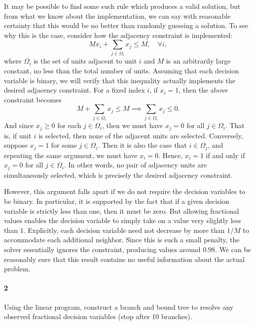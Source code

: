 \documentclass[12pt]{article}
\newenvironment{fullbox}{\begin{lrbox}{\savefullbox}\begin{minipage}{\dimexpr\textwidth-2\fboxsep\relax}}{\end{minipage}\end{lrbox}\begin{center}\framebox[\textwidth]{\usebox{\savefullbox}}\end{center}}
\newenvironment{pbox}[1][]{\begin{fullbox}\ifx#1\empty\else\paragraph{#1}\fi}{\end{fullbox}}
\theoremstyle{definition}
\newcommand{\tsum}{\textstyle\sum\limits}
\begin{document}
It may be possible to find some such rule which produces a valid solution, but from what we know about the implementation, we can say with reasonable certainty that this would be no better than randomly guessing a solution. To see why this is the case, consider how the adjacency constraint is implemented:
\[
    Mx_i + \tsum_{j \in \Omega_i} x_j \leq M, \quad \forall i,
\]
where $\Omega_i$ is the set of units adjacent to unit $i$ and $M$ is an arbitrarily large constant, no less than the total number of units. Assuming that each decision variable is binary, we will verify that this inequality actually implements the desired adjacency constraint. For a fixed index $i$, if $x_i = 1$, then the above constraint becomes
\[
    M + \tsum_{j \in \Omega_i} x_j \leq M
        \implies \tsum_{j \in \Omega_i} x_j \leq 0.
\]
And since $x_j \geq 0$ for each $j \in \Omega_i$, then we must have $x_j = 0$ for all $j \in \Omega_i$. That is, if unit $i$ is selected, then none of the adjacent units are selected. Conversely, suppose $x_j = 1$ for some $j \in \Omega_i$. Then it is also the case that $i \in \Omega_j$, and repeating the same argument, we must have $x_i = 0$. Hence, $x_i = 1$ if and only if $x_j = 0$ for all $j \in \Omega_i$. In other words, no pair of adjacency units are simultaneously selected, which is precisely the desired adjacency constraint.

However, this argument falls apart if we do not require the decision variables to be binary. In particular, it is supported by the fact that if a given decision variable is strictly less than one, then it must be zero. But allowing fractional values enables the decision variable to simply take on a value very slightly less than $1$. Explicitly, each decision variable need not decrease by more than $1/M$ to accommodate each additional neighbor. Since this is such a small penalty, the solver essentially ignores the constraint, producing values around $0.98$. We can be reasonably sure that this result contains no useful information about the actual problem.



\newpage
\begin{pbox}[2]
    Using the linear program, construct a branch and bound tree to resolve any observed fractional decision variables (stop after 10 branches).
\end{pbox}

\vspace{4pt}
\vspace{4pt}
\end{document}
